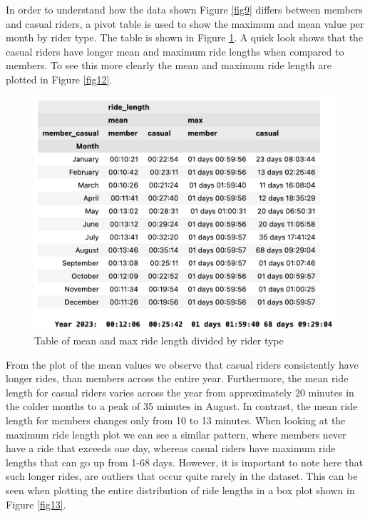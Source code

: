 \documentclass[12pt]{article}
\begin{document}
\begin{itemize}
	In order to understand how the data shown Figure \ref{fig9} differs between members and casual riders, a pivot table is used to show the maximum and mean value per month by rider type. The table is shown in Figure \ref{fig11}. A quick look shows that the casual riders have longer mean and maximum ride lengths when compared to members. To see this more clearly the mean and maximum ride length are plotted in Figure \ref{fig12}.  
		\pagebreak
		
	\begin{figure}[h]
	\centering
	\includegraphics[scale=0.6]{imgMeanMax2.png} 
	\caption{Table of mean and max ride length divided by rider type}
	\label{fig11}
	\end{figure}
	
From the plot of the mean values we observe that casual riders consistently have longer rides, than members across the entire year. Furthermore, the mean ride length for casual riders varies across the year from approximately 20 minutes in the colder months to a peak of 35 minutes in August. In contrast, the mean ride length for members changes only from 10 to 13 minutes. When looking at the maximum ride length plot we can see a similar pattern, where members never have a ride that exceeds one day, whereas casual riders have maximum ride lengths that can go up from 1-68 days. However, it is important to note here that such longer rides, are outliers that occur quite rarely in the dataset. This can be seen when plotting the entire distribution of ride lengths in a box plot shown in Figure \ref{fig13}.  
	

\end{itemize}
\end{document}
